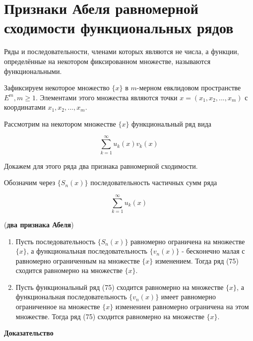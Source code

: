 \section{Признаки Абеля равномерной сходимости функциональных рядов}

\begin{definition}
	Ряды и последовательности, членами которых являются не числа, а функции, определённые на некотором фиксированном множестве, называются функциональными.
\end{definition}

Зафиксируем некоторое множество $\{x\}$ в $m$-мерном евклидовом пространстве $E^m, m \geqslant 1$. Элементами этого множества являются точки $x = (x_1, x_2, ..., x_m)$ с координатами $x_1, x_2, ..., x_m$.

Рассмотрим на некотором множестве $\{x\}$ функциональный ряд вида

\begin{equation}
	\displaystyle\sum_{k = 1}^\infty u_k(x) v_k(x)
\end{equation}

Докажем для этого ряда два признака равномерной сходимости.

Обозначим через $\{S_n(x)\}$ последовательность частичных сумм ряда

\begin{equation}
	\displaystyle\sum_{k  = 1}^\infty u_k(x)
\end{equation}

\begin{theorem}
	(\textbf{два признака Абеля}) \begin{enumerate}
		\item Пусть последовательность $\{S_n(x)\}$ равномерно ограничена на множестве $\{x\}$, а функциональная последовательность $\{v_n(x)\}$ - бесконечно малая с равномерно ограниченным на множестве $\{x\}$ изменением. Тогда ряд (75) сходится равномерно на множестве $\{x\}$.
		
		\item Пусть функциональный ряд (75) сходится равномерно на множестве $\{x\}$, а функциональная последовательность $\{v_n(x)\}$ имеет равномерно ограниченное на множестве $\{x\}$ изменениеи равномерно ограничена на этом множестве. Тогда ряд (75) сходится равномерно на множестве $\{x\}$.
	\end{enumerate}
\end{theorem}
\textbf{Доказательство}

